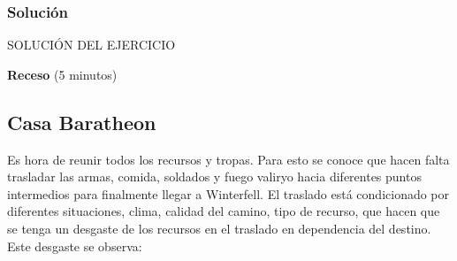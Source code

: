 \documentclass[a4paper,10pt,twocolumn]{article}
\theoremstyle{theorem}
\theoremstyle{definition}
\theoremstyle{remark}
\begin{document}
		\subsubsection{Solución}\label{subsubsec:sol_ejer_3}

SOLUCIÓN DEL EJERCICIO


\textbf{Receso} (5 minutos)

	\subsection{Casa Baratheon}\label{subsec:ejer_4}

Es hora de reunir todos los recursos y tropas. Para esto se conoce que hacen falta trasladar las armas, comida, soldados y fuego valiryo hacia diferentes puntos intermedios para finalmente llegar a Winterfell. El traslado está condicionado por diferentes situaciones, clima, calidad del camino, tipo de recurso, que hacen que se tenga un desgaste de los recursos en el traslado en dependencia del destino. Este desgaste se observa:
\end{document}
